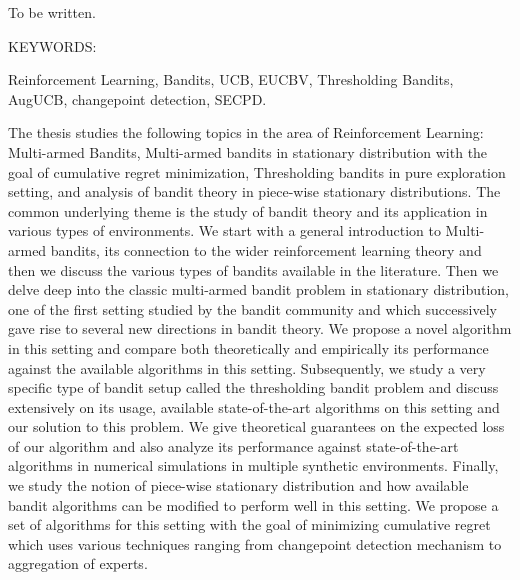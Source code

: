 \documentclass[MS]{iitmdiss}
\begin{document}
\acknowledgements
To be written.
%
%


\abstract

\noindent KEYWORDS: \hspace*{0.5em} \parbox[t]{4.4in}{Reinforcement Learning, Bandits, UCB, EUCBV, Thresholding Bandits,  AugUCB, changepoint detection, SECPD.}

\vspace*{24pt}

\noindent The thesis studies the following topics in the area of Reinforcement Learning: Multi-armed Bandits, Multi-armed bandits in stationary distribution with the goal of cumulative regret minimization, Thresholding bandits in pure exploration setting, and analysis of bandit theory in piece-wise stationary distributions. The common underlying theme is the study of bandit theory and its application in various types of environments. We start with a general introduction to Multi-armed bandits, its connection to the wider reinforcement learning theory and then we discuss the various types of bandits available in the literature. Then we delve deep into the classic multi-armed bandit problem in stationary distribution, one of the first setting studied by the bandit community and which successively gave rise to several new directions in bandit theory. We propose a novel algorithm in this setting and compare both theoretically and empirically its performance against the available algorithms in this setting. Subsequently, we study a very specific type of bandit setup called the thresholding bandit problem and discuss extensively on its usage, available state-of-the-art algorithms on this setting and our solution to this problem. We give theoretical guarantees on the expected loss of our algorithm and also analyze its performance against state-of-the-art algorithms in numerical simulations in multiple synthetic environments. Finally, we study the notion of piece-wise stationary distribution and how available bandit algorithms can be modified to perform well in this setting. We propose a set of algorithms for this setting with the goal of minimizing cumulative regret which uses various techniques ranging from changepoint detection mechanism to aggregation of experts.
\end{document}
